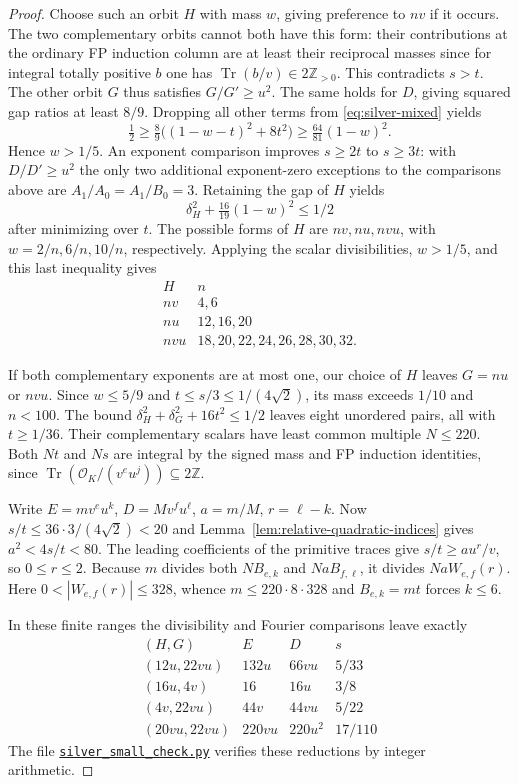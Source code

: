 \documentclass[11pt,reqno]{amsart}
\newcommand{\codefile}[1]{\href{https://github.com/sebastienpalcoux/grothendieck-ring-classification/blob/d5750105bb5758f3ad38d2e5464dfcc12c019816/supplements/rank6/sphericality/#1}{\nolinkurl{#1}}}
\theoremstyle{remark}\newtheorem{remark}[theorem]{Remark}
\numberwithin{equation}{section}
\begin{document}
\begin{proof}
Choose such an orbit $H$ with mass $w$, giving preference to $nv$
if it occurs. The two complementary orbits cannot both have this
form: their contributions at the ordinary FP induction column
are at least their reciprocal masses since for integral totally
positive $b$ one has $\operatorname{Tr}(b/v)\in2\mathbb Z_{>0}$.
This contradicts $s>t$. The other orbit $G$ thus satisfies
$G/G'\ge u^2$. The same holds for $D$, giving squared gap ratios
at least $8/9$. Dropping all other terms from \eqref{eq:silver-mixed}
yields
\[
 \tfrac12\ge\tfrac89\bigl((1-w-t)^2+8t^2\bigr)
 \ge\tfrac{64}{81}(1-w)^2 .
\]
Hence $w>1/5$. An exponent comparison improves $s\ge2t$ to
$s\ge3t$: with $D/D'\ge u^2$ the only two additional exponent-zero
exceptions to the comparisons above are $A_1/A_0=A_1/B_0=3$.
Retaining the gap of $H$ yields
\[
 \delta_H^2+\tfrac{16}{19}(1-w)^2\le1/2
\]
after minimizing over $t$. The possible forms of $H$ are $nv,nu,nvu$,
with $w=2/n,6/n,10/n$, respectively. Applying the scalar
divisibilities, $w>1/5$, and this last inequality gives
\[
\begin{array}{c|l}
 H & n\\ \hline
 nv&4,6\\
 nu&12,16,20\\
 nvu&18,20,22,24,26,28,30,32 .
\end{array}
\]

If both complementary exponents are at most one, our choice of $H$
leaves $G=nu$ or $nvu$. Since $w\le5/9$ and
$t\le s/3\le1/(4\sqrt2)$, its mass exceeds $1/10$ and $n<100$.
The bound $\delta_H^2+\delta_G^2+16t^2\le1/2$ leaves eight
unordered pairs, all with $t\ge1/36$. Their complementary scalars
have least common multiple $N\le220$. Both $Nt$ and $Ns$ are
integral by the signed mass and FP induction identities, since
$\operatorname{Tr}(\mathcal O_K/(v^eu^j))\subseteq2\mathbb Z$.

Write $E=mv^eu^k$, $D=Mv^fu^\ell$, $a=m/M$, $r=\ell-k$.
Now $s/t\le36\cdot3/(4\sqrt2)<20$ and
Lemma~\ref{lem:relative-quadratic-indices} gives $a^2<4s/t<80$.
The leading coefficients of the primitive traces give $s/t\ge au^r/v$,
so $0\le r\le2$. Because $m$ divides both $NB_{e,k}$
and $NaB_{f,\ell}$, it divides $NaW_{e,f}(r)$. Here
$0<|W_{e,f}(r)|\le328$, whence $m\le220\cdot8\cdot328$
and $B_{e,k}=mt$ forces $k\le6$.

In these finite ranges the divisibility and Fourier comparisons
leave exactly
\[
\begin{array}{c|c|c|c}
(H,G)& E&D&s\\\hline
(12u,22vu)&132u&66vu&5/33\\
(16u,4v)&16&16u&3/8\\
(4v,22vu)&44v&44vu&5/22\\
(20vu,22vu)&220vu&220u^2&17/110
\end{array}
\]
The file \codefile{silver_small_check.py} verifies these reductions by
integer arithmetic.


\end{proof}
\end{document}
